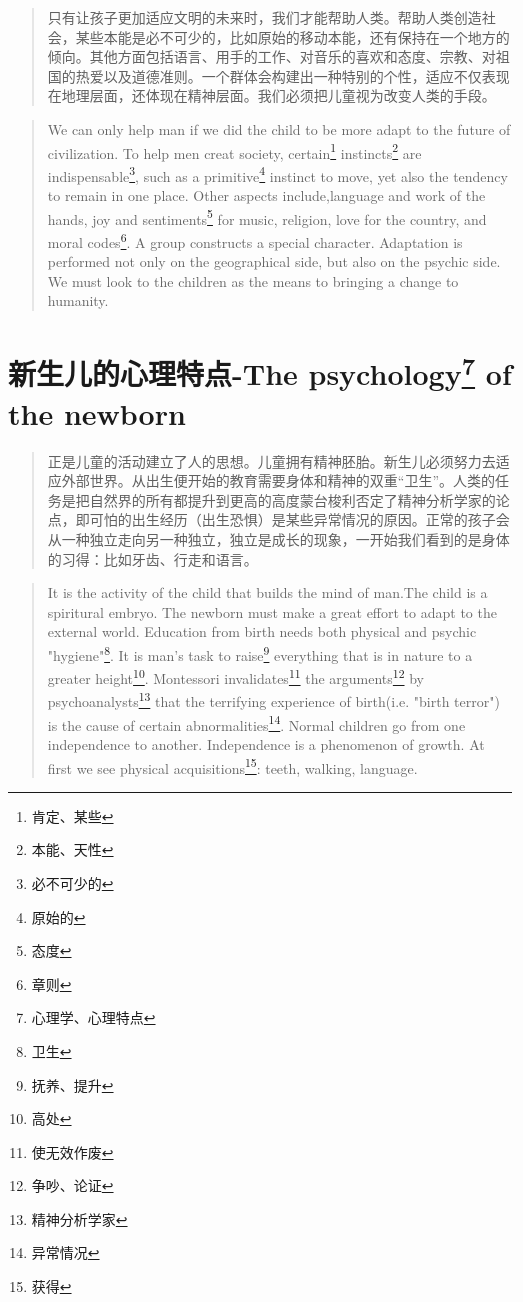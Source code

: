 \documentclass[lang=cn,10pt]{elegantbook}
\begin{document}
\begin{quote}
{\small 只有让孩子更加适应文明的未来时，我们才能帮助人类。帮助人类创造社会，某些本能是必不可少的，比如原始的移动本能，还有保持在一个地方的倾向。其他方面包括语言、用手的工作、对音乐的喜欢和态度、宗教、对祖国的热爱以及道德准则。一个群体会构建出一种特别的个性，适应不仅表现在地理层面，还体现在精神层面。我们必须把儿童视为改变人类的手段。}
\end{quote}

\begin{tcolorbox}
\begin{quote}
{\small We can only help man if we did the child to be more adapt to the future of civilization. To help men creat society, certain\footnote{肯定、某些} instincts\footnote{本能、天性} are indispensable\footnote{必不可少的}, such as a primitive\footnote{原始的} instinct to move, yet also the tendency to remain in one place. Other aspects include,language and work of the hands, joy and sentiments\footnote{态度} for music, religion, love for the country, and moral codes\footnote{章则}. A group constructs a special character. Adaptation is performed not only on the geographical side, but also on the psychic side. We must look to the children as the means to bringing a change to humanity.}
\end{quote}
\end{tcolorbox}

\chapter{新生儿的心理特点-The psychology\footnote{心理学、心理特点} of the newborn}

\begin{quote}
{\small 正是儿童的活动建立了人的思想。儿童拥有精神胚胎。新生儿必须努力去适应外部世界。从出生便开始的教育需要身体和精神的双重“卫生”。人类的任务是把自然界的所有都提升到更高的高度蒙台梭利否定了精神分析学家的论点，即可怕的出生经历（出生恐惧）是某些异常情况的原因。正常的孩子会从一种独立走向另一种独立，独立是成长的现象，一开始我们看到的是身体的习得：比如牙齿、行走和语言。}
\end{quote}

\begin{tcolorbox}
\begin{quote}
{\small It is the activity of the child that builds the mind of man.The child is a spiritural embryo. The newborn must make a great effort to adapt to the external world. Education from birth needs both physical and psychic "hygiene"\footnote{卫生}. It is man's task to raise\footnote{抚养、提升} everything that is in nature to a greater height\footnote{高处}. Montessori invalidates\footnote{使无效作废} the arguments\footnote{争吵、论证} by psychoanalysts\footnote{精神分析学家} that the terrifying experience of birth(i.e. "birth terror") is the cause of certain abnormalities\footnote{异常情况}. Normal children go from one independence to another. Independence is a phenomenon of growth. At first we see physical acquisitions\footnote{获得}: teeth, walking, language.}
\end{quote}
\end{tcolorbox}
\end{document}
